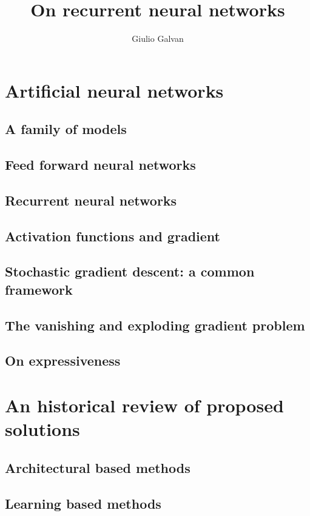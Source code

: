 \documentclass{book}
\title{On recurrent neural networks}
\author{Giulio Galvan}
\theoremstyle{definition}
\theoremstyle{definition}
\theoremstyle{definition}
\begin{document}
\maketitle
\tableofcontents
\chapter{Artificial neural networks}
  \section{A family of models}
  
  \section{Feed forward neural networks}
  
  \section{Recurrent neural networks}
  
  \section{Activation functions and gradient}
  
  \section{Stochastic gradient descent: a common framework}
  
  \section{The vanishing and exploding gradient problem}
    \label{vanishing_sec}
    
  \section{On expressiveness}
  
\chapter{An historical review of proposed solutions}
  
  \section{Architectural based methods}
  
  
  
  \section{Learning based methods}
\end{document}
